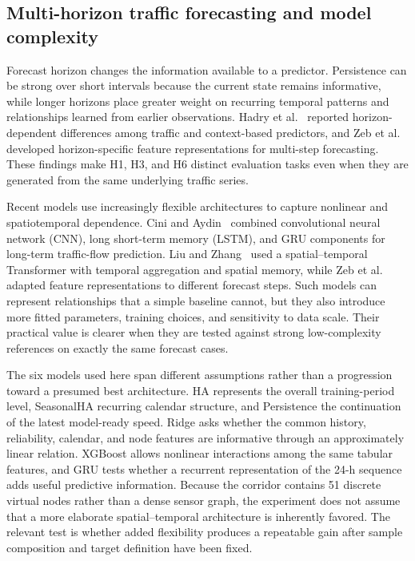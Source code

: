 \documentclass[pdflatex,sn-basic,Numbered]{sn-jnl}
\begin{document}
\subsection{Multi-horizon traffic forecasting and model complexity}
\label{subsec:model-related}

Forecast horizon changes the information available to a predictor. Persistence can be strong over short intervals because the current state remains informative, while longer horizons place greater weight on recurring temporal patterns and relationships learned from earlier observations. Hadry et al.~\cite{Hadry2025TrafficForecasting} reported horizon-dependent differences among traffic and context-based predictors, and Zeb et al.~\cite{Zeb2024FeatureProjection} developed horizon-specific feature representations for multi-step forecasting. These findings make H1, H3, and H6 distinct evaluation tasks even when they are generated from the same underlying traffic series.

Recent models use increasingly flexible architectures to capture nonlinear and spatiotemporal dependence. Cini and Aydin~\cite{Cini2024DeepEnsemble} combined convolutional neural network (CNN), long short-term memory (LSTM), and GRU components for long-term traffic-flow prediction. Liu and Zhang~\cite{Liu2024SpatialTemporalTransformer} used a spatial--temporal Transformer with temporal aggregation and spatial memory, while Zeb et al.~\cite{Zeb2024FeatureProjection} adapted feature representations to different forecast steps. Such models can represent relationships that a simple baseline cannot, but they also introduce more fitted parameters, training choices, and sensitivity to data scale. Their practical value is clearer when they are tested against strong low-complexity references on exactly the same forecast cases.

The six models used here span different assumptions rather than a progression toward a presumed best architecture. HA represents the overall training-period level, SeasonalHA recurring calendar structure, and Persistence the continuation of the latest model-ready speed. Ridge asks whether the common history, reliability, calendar, and node features are informative through an approximately linear relation. XGBoost allows nonlinear interactions among the same tabular features, and GRU tests whether a recurrent representation of the 24-h sequence adds useful predictive information. Because the corridor contains 51 discrete virtual nodes rather than a dense sensor graph, the experiment does not assume that a more elaborate spatial--temporal architecture is inherently favored. The relevant test is whether added flexibility produces a repeatable gain after sample composition and target definition have been fixed.
\end{document}
